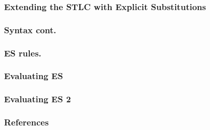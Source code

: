 \documentclass
  [hyperref={colorlinks = true,linkcolor = blue, 
             citecolor = blue, urlcolor = blue}
  ]{beamer}
\begin{document}
\begin{frame}[fragile]
  \frametitle{Extending the STLC with Explicit Substitutions}
\end{frame}

\begin{frame}[fragile]
  \frametitle{Syntax cont.}
\end{frame}

\begin{frame}[fragile]
  \frametitle{ES rules.}
\end{frame}

\begin{frame}[fragile]
  \frametitle{Evaluating ES}
\end{frame}

\begin{frame}[fragile]
  \frametitle{Evaluating ES 2}
\end{frame}




%   


\begin{frame}[fragile]
\frametitle{References}
{}
\end{frame}
\end{document}
